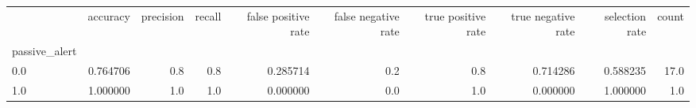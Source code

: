 \begin{tabular}{lrrrrrrrrr}
\toprule
{} &  accuracy &  precision &  recall &  false positive rate &  false negative rate &  true positive rate &  true negative rate &  selection rate &  count \\
passive\_alert &           &            &         &                      &                      &                     &                     &                 &        \\
\midrule
0.0           &  0.764706 &        0.8 &     0.8 &             0.285714 &                  0.2 &                 0.8 &            0.714286 &        0.588235 &   17.0 \\
1.0           &  1.000000 &        1.0 &     1.0 &             0.000000 &                  0.0 &                 1.0 &            0.000000 &        1.000000 &    1.0 \\
\bottomrule
\end{tabular}
